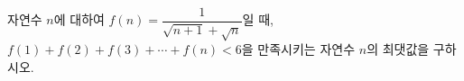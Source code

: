 자연수 $n$에 대하여 $f(n)=\dfrac{1}{\sqrt{n+1}+\sqrt{n}}$일 때, $f(1)+f(2)+f(3)+\cdots+f(n)<6$을 만족시키는 자연수 $n$의 최댓값을 구하시오.
